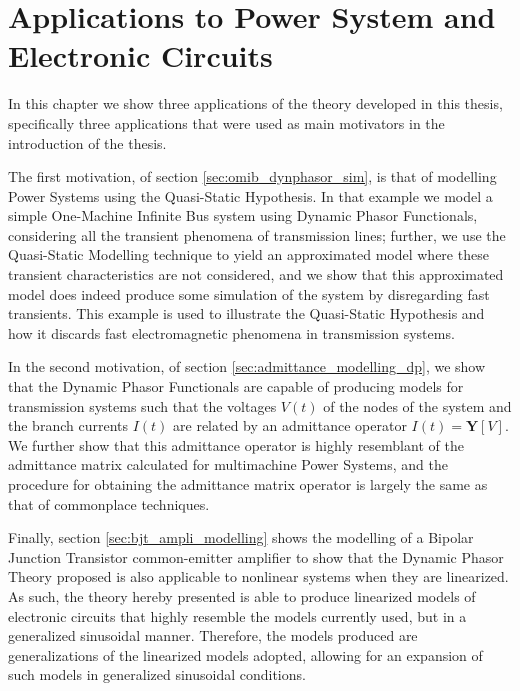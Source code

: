 \chapter{Applications to Power System and Electronic Circuits}\label{chapter:applications}

	In this chapter we show three applications of the theory developed in this thesis, specifically three applications that were used as main motivators in the introduction of the thesis.

	The first motivation, of section \ref{sec:omib_dynphasor_sim}, is that of modelling Power Systems using the Quasi-Static Hypothesis. In that example we model a simple One-Machine Infinite Bus system using Dynamic Phasor Functionals, considering all the transient phenomena of transmission lines; further, we use the Quasi-Static Modelling technique to yield an approximated model where these transient characteristics are not considered, and we show that this approximated model does indeed produce some simulation of the system by disregarding fast transients. This example is used to illustrate the Quasi-Static Hypothesis and how it discards fast electromagnetic phenomena in transmission systems.

	In the second motivation, of section \ref{sec:admittance_modelling_dp}, we show that the Dynamic Phasor Functionals are capable of producing models for transmission systems such that the voltages $V(t)$ of the nodes of the system and the branch currents $I(t)$ are related by an admittance operator $I(t) = \mathbf{Y}\left[V\right]$. We further show that this admittance operator is highly resemblant of the admittance matrix calculated for multimachine Power Systems, and the procedure for obtaining the admittance matrix operator is largely the same as that of commonplace techniques.

	Finally, section \ref{sec:bjt_ampli_modelling} shows the modelling of a Bipolar Junction Transistor common-emitter amplifier to show that the Dynamic Phasor Theory proposed is also applicable to nonlinear systems when they are linearized. As such, the theory hereby presented is able to produce linearized models of electronic circuits that highly resemble the models currently used, but in a generalized sinusoidal manner. Therefore, the models produced are generalizations of the linearized models adopted, allowing for an expansion of such models in generalized sinusoidal conditions.

